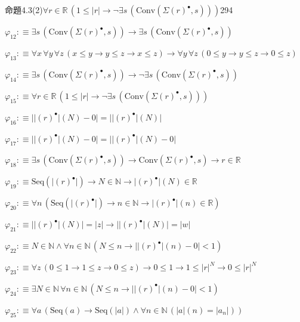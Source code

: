 \begin{fullproof}{命題4.3(2)}{$\forall r \in \mathbb{R}\,(1 \leq \lvert r \rvert \to \neg \exists s\,(\mathrm{Conv}(\Sigma {(r)^{\bullet}},s)))$}{294}
\begin{abbrevlist}
\item $\varphi_{12} :\equiv \exists s\,(\mathrm{Conv}(\Sigma {(r)^{\bullet}},s)) \to \exists s\,(\mathrm{Conv}(\Sigma {(r)^{\bullet}},s))$
\item $\varphi_{13} :\equiv \forall x\,\forall y\,\forall z\,(x \leq y \to y \leq z \to x \leq z) \to \forall y\,\forall z\,(0 \leq y \to y \leq z \to 0 \leq z)$
\item $\varphi_{14} :\equiv \exists s\,(\mathrm{Conv}(\Sigma {(r)^{\bullet}},s)) \to \neg \exists s\,(\mathrm{Conv}(\Sigma {(r)^{\bullet}},s))$
\item $\varphi_{15} :\equiv \forall r \in \mathbb{R}\,(1 \leq \lvert r \rvert \to \neg \exists s\,(\mathrm{Conv}(\Sigma {(r)^{\bullet}},s)))$
\item $\varphi_{16} :\equiv \lvert \lvert {(r)^{\bullet}} \rvert(N) - 0 \rvert = \lvert \lvert {(r)^{\bullet}} \rvert(N) \rvert$
\item $\varphi_{17} :\equiv \lvert \lvert {(r)^{\bullet}} \rvert(N) - 0 \rvert = \lvert \lvert {(r)^{\bullet}} \rvert(N) - 0 \rvert$
\item $\varphi_{18} :\equiv \exists s\,(\mathrm{Conv}(\Sigma {(r)^{\bullet}},s)) \to \mathrm{Conv}(\Sigma {(r)^{\bullet}},s) \to r \in \mathbb{R}$
\item $\varphi_{19} :\equiv \mathrm{Seq}(\lvert {(r)^{\bullet}} \rvert) \to N \in \mathbb{N} \to \lvert {(r)^{\bullet}} \rvert(N) \in \mathbb{R}$
\item $\varphi_{20} :\equiv \forall n\,(\mathrm{Seq}(\lvert {(r)^{\bullet}} \rvert) \to n \in \mathbb{N} \to \lvert {(r)^{\bullet}} \rvert(n) \in \mathbb{R})$
\item $\varphi_{21} :\equiv \lvert \lvert {(r)^{\bullet}} \rvert(N) \rvert = \lvert z \rvert \to \lvert \lvert {(r)^{\bullet}} \rvert(N) \rvert = \lvert w \rvert$
\item $\varphi_{22} :\equiv N \in \mathbb{N} \land \forall n \in \mathbb{N}\,(N \leq n \to \lvert \lvert {(r)^{\bullet}} \rvert(n) - 0 \rvert < 1)$
\item $\varphi_{23} :\equiv \forall z\,(0 \leq 1 \to 1 \leq z \to 0 \leq z) \to 0 \leq 1 \to 1 \leq {{\lvert r \rvert}^{N}} \to 0 \leq {{\lvert r \rvert}^{N}}$
\item $\varphi_{24} :\equiv \exists N \in \mathbb{N}\,\forall n \in \mathbb{N}\,(N \leq n \to \lvert \lvert {(r)^{\bullet}} \rvert(n) - 0 \rvert < 1)$
\item $\varphi_{25} :\equiv \forall a\,(\mathrm{Seq}(a) \to \mathrm{Seq}(\lvert a \rvert) \land \forall n \in \mathbb{N}\,(\lvert a \rvert(n) = \lvert a_{n} \rvert))$

\end{abbrevlist}
\end{fullproof}
